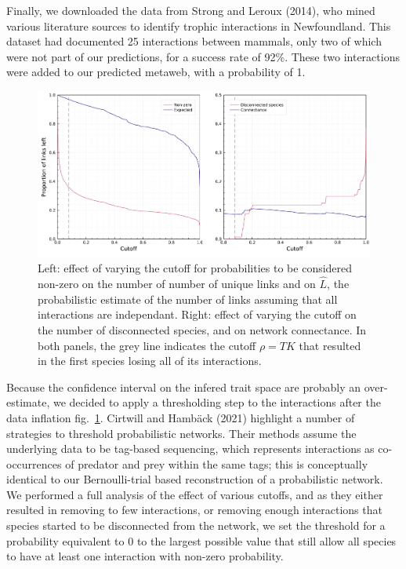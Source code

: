 \documentclass[10pt,oneside]{article}
\makeatletter
\def\maxwidth{\ifdim\Gin@nat@width>\linewidth\linewidth
\else\Gin@nat@width\fi}
\let\Oldincludegraphics\includegraphics
\renewcommand{\includegraphics}[1]{\Oldincludegraphics[width=\maxwidth]{#1}}
\makeatother
\begin{document}
Finally, we downloaded the data from Strong and Leroux (2014), who mined
various literature sources to identify trophic interactions in
Newfoundland. This dataset had documented 25 interactions between
mammals, only two of which were not part of our predictions, for a
success rate of 92\%. These two interactions were added to our predicted
metaweb, with a probability of 1.

\begin{figure}
\hypertarget{fig:thresholds}{%
\centering
\includegraphics{figures/figure-cutoffs.png}
\caption{Left: effect of varying the cutoff for probabilities to be
considered non-zero on the number of number of unique links and on
\(\hat{L}\), the probabilistic estimate of the number of links assuming
that all interactions are independant. Right: effect of varying the
cutoff on the number of disconnected species, and on network
connectance. In both panels, the grey line indicates the cutoff
\(\rho = TK\) that resulted in the first species losing all of its
interactions.}\label{fig:thresholds}
}
\end{figure}

Because the confidence interval on the infered trait space are probably
an over-estimate, we decided to apply a thresholding step to the
interactions after the data inflation fig.~\ref{fig:thresholds}.
Cirtwill and Hambäck (2021) highlight a number of strategies to
threshold probabilistic networks. Their methods assume the underlying
data to be tag-based sequencing, which represents interactions as
co-occurrences of predator and prey within the same tags; this is
conceptually identical to our Bernoulli-trial based reconstruction of a
probabilistic network. We performed a full analysis of the effect of
various cutoffs, and as they either resulted in removing to few
interactions, or removing enough interactions that species started to be
disconnected from the network, we set the threshold for a probability
equivalent to 0 to the largest possible value that still allow all
species to have at least one interaction with non-zero probability.
\end{document}
